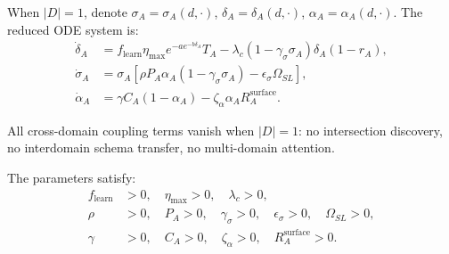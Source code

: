 
\begin{definition}
When $|D| = 1$, denote $\sigma_A = \sigma_A(d, \cdot)$,
$\delta_A = \delta_A(d, \cdot)$, $\alpha_A = \alpha_A(d, \cdot)$.
The reduced ODE system is:
\begin{align*}
\dot{\delta}_A &= f_{\text{learn}} \eta_{\max} e^{-a e^{-b \delta_A}} T_A
- \lambda_c (1 - \gamma_\sigma \sigma_A) \delta_A (1 - r_A), \\
\dot{\sigma}_A &= \sigma_A [\rho P_A \alpha_A (1 - \gamma_\sigma \sigma_A) - \epsilon_\sigma \Omega_{SL}], \\
\dot{\alpha}_A &= \gamma C_A (1 - \alpha_A) - \zeta_\alpha \alpha_A R_A^{\text{surface}}.
\end{align*}
\end{definition}

\begin{assumption}
All cross-domain coupling terms vanish when $|D| = 1$: no intersection
discovery, no interdomain schema transfer, no multi-domain attention.
\end{assumption}

\begin{assumption}
The parameters satisfy:
\begin{align*}
f_{\text{learn}} &> 0, \quad \eta_{\max} > 0, \quad \lambda_c > 0, \\
\rho &> 0, \quad P_A > 0, \quad \gamma_\sigma > 0, \quad \epsilon_\sigma > 0, \quad \Omega_{SL} > 0, \\
\gamma &> 0, \quad C_A > 0, \quad \zeta_\alpha > 0, \quad R_A^{\text{surface}} > 0.
\end{align*}
\end{assumption}

